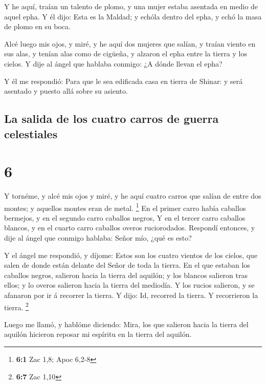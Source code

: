  Y he aquí, traían un talento de plomo, y una mujer estaba
asentada en medio de aquel epha.  Y él dijo: Esta es la
Maldad; y echóla dentro del epha, y echó la masa de plomo en su boca.

 Alcé luego mis ojos, y miré, y he aquí dos mujeres que
salían, y traían viento en sus alas, y tenían alas como de cigüeña, y
alzaron el epha entre la tierra y los cielos.  Y dije al
ángel que hablaba conmigo: ¿A dónde llevan el epha?

 Y él me respondió: Para que le sea edificada casa en
tierra de Shinar: y será asentado y puesto allá sobre su asiento.

\hypertarget{la-salida-de-los-cuatro-carros-de-guerra-celestiales}{%
\subsection{La salida de los cuatro carros de guerra
celestiales}\label{la-salida-de-los-cuatro-carros-de-guerra-celestiales}}

\hypertarget{section-5}{%
\section{6}\label{section-5}}

 Y tornéme, y alcé mis ojos y miré, y he aquí cuatro
carros que salían de entre dos montes; y aquellos montes eran de metal.
\footnote{\textbf{6:1} Zac 1,8; Apoc 6,2-8}  En el primer
carro había caballos bermejos, y en el segundo carro caballos negros,
 Y en el tercer carro caballos blancos, y en el cuarto
carro caballos overos ruciorodados.  Respondí entonces, y
dije al ángel que conmigo hablaba: Señor mío, ¿qué es esto?

 Y el ángel me respondió, y díjome: Estos son los cuatro
vientos de los cielos, que salen de donde están delante del Señor de
toda la tierra.  En el que estaban los caballos negros,
salieron hacia la tierra del aquilón; y los blancos salieron tras ellos;
y lo overos salieron hacia la tierra del mediodía.  Y los
rucios salieron, y se afanaron por ir á recorrer la tierra. Y dijo: Id,
recorred la tierra. Y recorrieron la tierra. \footnote{\textbf{6:7} Zac
  1,10}

 Luego me llamó, y hablóme diciendo: Mira, los que
salieron hacia la tierra del aquilón hicieron reposar mi espíritu en la
tierra del aquilón.

